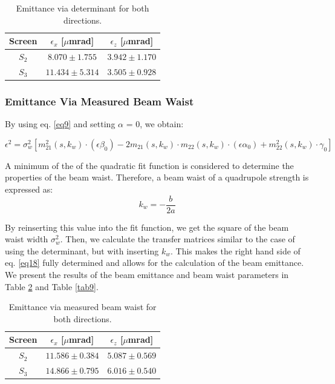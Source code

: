 \documentclass[12pt]{article}
\begin{document}
\begin{table}[H]
    \centering
    \begin{tabular}{c|c|c}
    \hline
    \hline
         Screen &   $\epsilon_x$ [$\mu$mrad] & $\epsilon_z $ [$\mu$mrad] \\
    \hline
         $S_2$ & $8.070 \pm 1.755$ &  $3.942 \pm 1.170$ \\
         $S_3$ & $11.434 \pm 5.314$ & $3.505 \pm 0.928$  \\
    \hline
    
    \end{tabular}
    \caption{Emittance via determinant for both directions.}
    \label{tab:emittance via determinant}
\end{table}
\subsubsection*{Emittance Via Measured Beam Waist}
By using eq. \ref{eq9} and setting $\alpha$ = 0, we obtain:

\begin{equation}
\epsilon^2=\sigma_w^2\left[m_{21}^2\left(s, k_w\right) \cdot\left(\epsilon \beta_0\right)-2 m_{21}\left(s, k_w\right) \cdot m_{22}\left(s, k_w\right) \cdot\left(\epsilon \alpha_0\right)+m_{22}^2\left(s, k_w\right) \cdot \gamma_0\right]
\label{eq18}
\end{equation}

A minimum of the of the quadratic fit function is considered to determine the properties of the beam waist. Therefore, a beam waist of a quadrupole strength is expressed as:
\begin{equation}
k_w=-\frac{b}{2 a}
\end{equation}

By reinserting this value into the fit function, we get the square of the beam waist width $\sigma^2_w$. Then, we calculate the transfer matrices similar to the case of using the determinant, but with inserting $k_w$. This makes the right hand side of eq. \ref{eq18} fully determined and allows for the calculation of the beam emittance. We present the results of the beam emittance and beam waist parameters in Table \ref{tab8} and Table \ref{tab9}. 

\begin{table}[H]
    \centering
    \begin{tabular}{c|c|c}
    \hline
    \hline
         Screen &  $\epsilon_x$ [$\mu$mrad] & $\epsilon_z $ [$\mu$mrad] \\
    \hline
         $S_2$ & $ 11.586 \pm 0.384$ & $5.087 \pm 0.569$  \\
         $S_3$ & $14.866 \pm 0.795$ & $6.016 \pm 0.540$  \\
    \hline
    
    \end{tabular}
    \caption{Emittance via measured beam waist for both directions.}
    \label{tab8}
\end{table}
\end{document}
